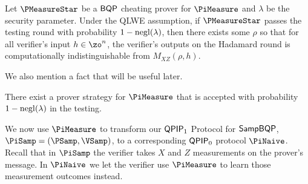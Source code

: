 \begin{lemma}
\label{lem:urmila-binding}
	Let $\PMeasureStar$ be a $\operatorname{\mathsf{BQP}}$ cheating  prover for $\PiMeasure$ and $\lambda$ be the security parameter. Under the QLWE assumption, if $\PMeasureStar$ passes the testing round with probability $1-\negl(\lambda)$, then there exists some $\rho$ so that for all verifier's input $h \in \zo^n$, the verifier's outputs on the Hadamard round is computationally indistinguishable from $M_{XZ}(\rho, h)$.
\iffalse	
	Suppose that for all $\lambda\in\bbN$ and $h\in\zo^*$ \Ethan{or $\zo^n$?},
	$\PMeasureStar$ passes the testing round with probability $1-\negl(\lambda)$.
	Then, under the QLWE assumption, there exists some $\rho$ so that for all $h$,
	the verifier's outputs on the Hadamard round is $\negl(\lambda)$-computationally indistinguishable from $M_{XZ}(\rho, h)$.
\fi
\end{lemma}

We also mention a fact that will be useful later.
\begin{fact}
\label{lem:trivial-4-round-strategy}
   There exist a prover strategy for $\PiMeasure$ that is accepted with probability $1-\negl(\lambda)$  in the testing.
\end{fact}


We now use $\PiMeasure$ to transform our $\operatorname{\mathsf{QPIP}}_1$ Protocol for $\operatorname{\mathsf{SampBQP}}$, $\PiSamp=(\PSamp, \VSamp)$, to a corresponding $\operatorname{\mathsf{QPIP}}_0$ protocol $\PiNaive$.
Recall that in $\PiSamp$ the verifier takes $X$ and $Z$ measurements on the prover's message.
In $\PiNaive$ we let the verifier use $\PiMeasure$ to learn those measurement outcomes instead.


